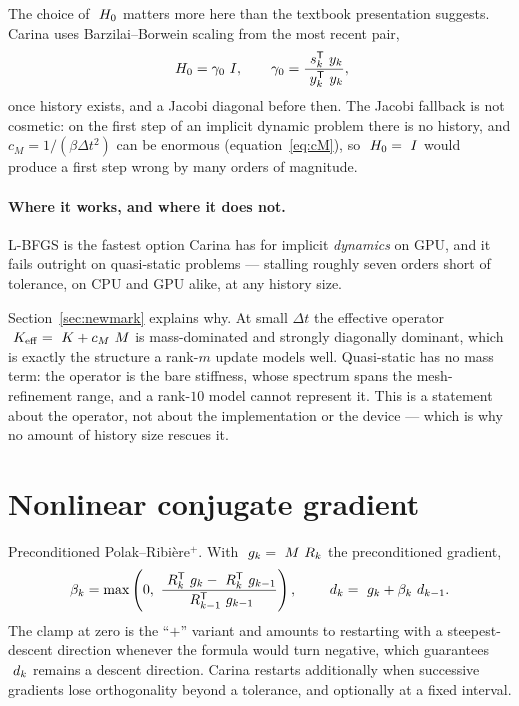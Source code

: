 The choice of $~H_0$ matters more here than the textbook presentation
suggests.  Carina uses Barzilai--Borwein scaling from the most recent pair,
\begin{equation}
  ~H_0 = \gamma_0 ~I,
  \qquad
  \gamma_0 = \frac{~s_k^{\mathsf{T}}~y_k}{~y_k^{\mathsf{T}}~y_k},
\end{equation}
once history exists, and a Jacobi diagonal before then.  The Jacobi fallback is
not cosmetic: on the first step of an implicit dynamic problem there is no
history, and $c_M = 1/(\beta\Delta t^2)$ can be enormous
(equation~\ref{eq:cM}), so $~H_0 = ~I$ would produce a first step
wrong by many orders of magnitude.

\paragraph{Where it works, and where it does not.}  L-BFGS is the fastest
option Carina has for implicit \emph{dynamics} on GPU, and it fails outright on
quasi-static problems --- stalling roughly seven orders short of tolerance, on
CPU and GPU alike, at any history size.

Section~\ref{sec:newmark} explains why.  At small $\Delta t$ the effective
operator $~K_{\mathrm{eff}} = ~K + c_M~M$ is mass-dominated and strongly diagonally
dominant, which is exactly the structure a rank-$m$ update models well.
Quasi-static has no mass term: the operator is the bare stiffness, whose
spectrum spans the mesh-refinement range, and a rank-$10$ model cannot
represent it.  This is a statement about the operator, not about the
implementation or the device --- which is why no amount of history size
rescues it.

\section{Nonlinear conjugate gradient}

Preconditioned Polak--Ribi\`ere$^+$.  With $~g_k = ~M~R_k$ the
preconditioned gradient,
\begin{equation}
  \beta_k = \max\left(0,\
  \frac{~R_k^{\mathsf{T}}~g_k - ~R_k^{\mathsf{T}}~g_{k-1}}
       {~R_{k-1}^{\mathsf{T}}~g_{k-1}}\right),
  \qquad
  ~d_k = ~g_k + \beta_k ~d_{k-1}.
\end{equation}
The clamp at zero is the ``$+$'' variant and amounts to restarting with a
steepest-descent direction whenever the formula would turn negative, which
guarantees $~d_k$ remains a descent direction.  Carina restarts
additionally when successive gradients lose orthogonality beyond a tolerance,
and optionally at a fixed interval.

